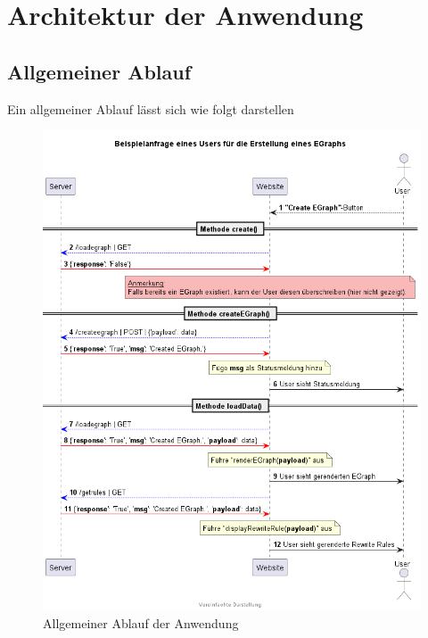 \section{Architektur der Anwendung}\label{sec:architektur}

\subsection{Allgemeiner Ablauf}

Ein allgemeiner Ablauf lässt sich wie folgt darstellen

\begin{figure}[H]
  \includegraphics[width=\textwidth]{../fig/query.png}
  \caption{Allgemeiner Ablauf der Anwendung}
  \label{fig:ablauf}
\end{figure}